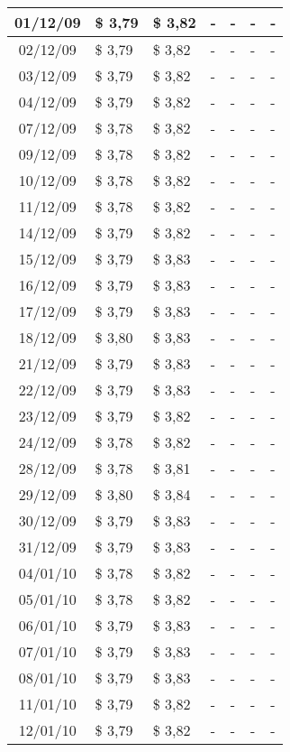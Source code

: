 \begin{center}
\begin{longtable}{|c|p{1.5cm}|p{1.5cm}|p{1.5cm}|p{1.5cm}|p{1.5cm}|p{1.5cm}|}
01/12/09 & \$ 3,79 & \$ 3,82 & - & - & - & - \\ \hline
02/12/09 & \$ 3,79 & \$ 3,82 & - & - & - & - \\ \hline
03/12/09 & \$ 3,79 & \$ 3,82 & - & - & - & - \\ \hline
04/12/09 & \$ 3,79 & \$ 3,82 & - & - & - & - \\ \hline
07/12/09 & \$ 3,78 & \$ 3,82 & - & - & - & - \\ \hline
09/12/09 & \$ 3,78 & \$ 3,82 & - & - & - & - \\ \hline
10/12/09 & \$ 3,78 & \$ 3,82 & - & - & - & - \\ \hline
11/12/09 & \$ 3,78 & \$ 3,82 & - & - & - & - \\ \hline
14/12/09 & \$ 3,79 & \$ 3,82 & - & - & - & - \\ \hline
15/12/09 & \$ 3,79 & \$ 3,83 & - & - & - & - \\ \hline
16/12/09 & \$ 3,79 & \$ 3,83 & - & - & - & - \\ \hline
17/12/09 & \$ 3,79 & \$ 3,83 & - & - & - & - \\ \hline
18/12/09 & \$ 3,80 & \$ 3,83 & - & - & - & - \\ \hline
21/12/09 & \$ 3,79 & \$ 3,83 & - & - & - & - \\ \hline
22/12/09 & \$ 3,79 & \$ 3,83 & - & - & - & - \\ \hline
23/12/09 & \$ 3,79 & \$ 3,82 & - & - & - & - \\ \hline
24/12/09 & \$ 3,78 & \$ 3,82 & - & - & - & - \\ \hline
28/12/09 & \$ 3,78 & \$ 3,81 & - & - & - & - \\ \hline
29/12/09 & \$ 3,80 & \$ 3,84 & - & - & - & - \\ \hline
30/12/09 & \$ 3,79 & \$ 3,83 & - & - & - & - \\ \hline
31/12/09 & \$ 3,79 & \$ 3,83 & - & - & - & - \\ \hline
04/01/10 & \$ 3,78 & \$ 3,82 & - & - & - & - \\ \hline
05/01/10 & \$ 3,78 & \$ 3,82 & - & - & - & - \\ \hline
06/01/10 & \$ 3,79 & \$ 3,83 & - & - & - & - \\ \hline
07/01/10 & \$ 3,79 & \$ 3,83 & - & - & - & - \\ \hline
08/01/10 & \$ 3,79 & \$ 3,83 & - & - & - & - \\ \hline
11/01/10 & \$ 3,79 & \$ 3,82 & - & - & - & - \\ \hline
12/01/10 & \$ 3,79 & \$ 3,82 & - & - & - & - \\ \hline

\end{longtable}
\end{center}
